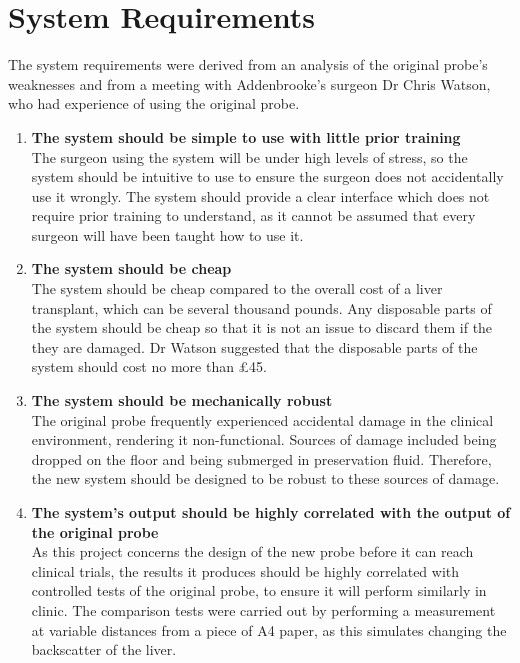 \section{System Requirements}

The system requirements were derived from an analysis of the original probe's weaknesses and from a meeting with Addenbrooke's surgeon Dr Chris Watson, who had experience of using the original probe.


\begin{enumerate}
\item \label{req: simple} \textbf{The system should be simple to use with little prior training}\\
The surgeon using the system will be under high levels of stress, so the system should be intuitive to use to ensure the surgeon does not accidentally use it wrongly. The system should provide a clear interface which does not require prior training to understand, as it cannot be assumed that every surgeon will have been taught how to use it.

\item \label{req: cheap} \textbf{The system should be cheap}\\
The system should be cheap compared to the overall cost of a liver transplant, which can be several thousand pounds. Any disposable parts of the system should be cheap so that it is not an issue to discard them if the they are damaged. Dr Watson suggested that the disposable parts of the system should cost no more than £45.

\item \label{req: robust} \textbf{The system should be mechanically robust}\\
The original probe frequently experienced accidental damage in the clinical environment, rendering it non-functional. Sources of damage included being dropped on the floor and being submerged in preservation fluid. Therefore, the new system should be designed to be robust to these sources of damage.



\item \label{req: correlation} \textbf{The system's output should be highly correlated with the output of the original probe}\\
As this project concerns the design of the new probe before it can reach clinical trials, the results it produces should be highly correlated with controlled tests of the original probe, to ensure it will perform similarly in clinic. The comparison tests were carried out by performing a measurement at variable distances from a piece of A4 paper, as this simulates changing the backscatter of the liver.




\end{enumerate}

